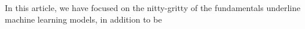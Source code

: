 In this article, we have focused on the nitty-gritty of the fundamentals underline machine learning models, in addition to be 